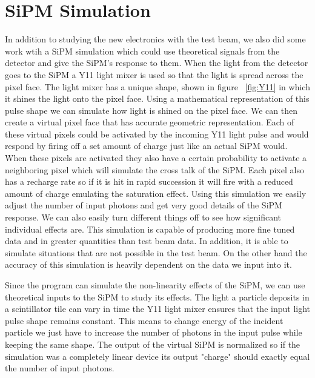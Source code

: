 \section{SiPM Simulation}

In addition to studying the new electronics with the test beam, we also did some work wtih a SiPM simulation which could use theoretical signals from the detector and give the SiPM's response to them. When the light from the detector goes to the SiPM a Y11 light mixer is used so that the light is spread across the pixel face. The light mixer has a unique shape, shown in figure ~\ref{fig:Y11} in which it shines the light onto the pixel face. Using a mathematical representation of this pulse shape we can simulate how light is shined on the pixel face. We can then create a virtual pixel face that has accurate geometric representation. Each of these virtual pixels could be activated by the incoming Y11 light pulse and would respond by firing off a set amount of charge just like an actual SiPM would. When these pixels are activated they also have a certain probability to activate a neighboring pixel which will simulate the cross talk of the SiPM. Each pixel also has a recharge rate so if it is hit in rapid succession it will fire with a reduced amount of charge emulating the saturation effect. Using this simulation we easily adjust the number of input photons and get very good details of the SiPM response. We can also easily turn different things off to see how significant individual effects are. This simulation is capable of producing more fine tuned data and in greater quantities than test beam data. In addition, it is able to simulate situations that are not possible in the test beam. On the other hand the accuracy of this simulation is heavily dependent on the data we input into it.

Since the program can simulate the non-linearity effects of the SiPM, we can use theoretical inputs to the SiPM to study its effects. The light a particle deposits in a scintillator tile can vary in time the Y11 light mixer ensures that the input light pulse shape remains constant. This means to change energy of the incident particle we just have to increase the number of photons in the input pulse while keeping the same shape. The output of the virtual SiPM is normalized so if the simulation was a completely linear device its output "charge" should exactly equal the number of input photons. 

